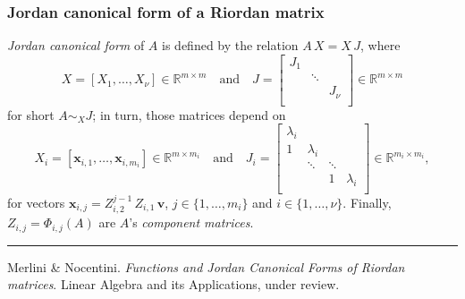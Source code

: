 \documentclass[9pt]{beamer}
\begin{document}
\begin{frame}[fragile]
\frametitle{Jordan canonical form of a Riordan matrix}
\textit{Jordan canonical
form} of $A$ is defined by the relation $A\,X = X\, J$, where
\begin{displaymath}
X = \left[X_{1},\ldots,X_{\nu} \right]\in\mathbb{R}^{m\times m} \quad\text{and}\quad
J = \left[ \begin{array}{ccc}
    J_{1} \\
      & \ddots \\
      & & J_{\nu} \\
\end{array} \right] \in\mathbb{R}^{m\times m}
\end{displaymath}
for short $A\sim_{X}J$; in turn, those matrices depend on
\begin{displaymath}
X_{i}   = \left[\boldsymbol{x}_{i,1},\ldots,\boldsymbol{x}_{i,m_{i}} \right]\in\mathbb{R}^{m\times m_{i}}\quad\text{and}\quad
J_{i}   = \left[ \begin{array}{cccc}
    \lambda_{i} \\
    1 & \lambda_{i} \\
      & \ddots & \ddots \\
      & & 1 &\lambda_{i} \\
\end{array} \right] \in\mathbb{R}^{m_{i}\times m_{i}},
\end{displaymath}
for vectors $\boldsymbol{x}_{i,j} =
    Z_{i,2}^{j-1}\,Z_{i,1}\,\boldsymbol{v}$, $j\in\lbrace1,\ldots,m_{i}\rbrace$ and
    $i\in \lbrace 1,\ldots,\nu \rbrace$. Finally, $Z_{i,j} = \Phi_{i,j}(A)$
    are $A$'s \textit{component matrices}.
\vfill
\noindent\rule{\textwidth}{0.1pt}
{\footnotesize
Merlini \& Nocentini. \textit{Functions and Jordan Canonical Forms of Riordan
matrices}. \newline Linear Algebra and its Applications, under review.}
\end{frame}
\end{document}
